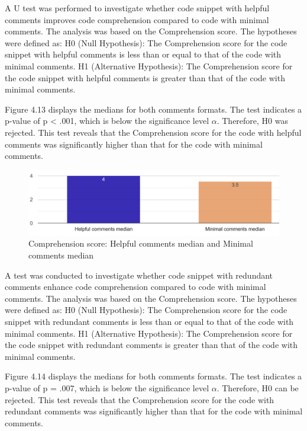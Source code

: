 A U test was performed to investigate whether code snippet with helpful comments improves code comprehension compared to code with minimal comments. The analysis was based on the Comprehension score. The hypotheses were defined as: H0 (Null Hypothesis): The Comprehension score for the code snippet with helpful comments is less than or equal to that of the code with minimal comments.  H1 (Alternative Hypothesis): The Comprehension score for the code snippet with helpful comments is greater than that of the code with minimal comments.

Figure 4.13 displays the medians for both comments formats.
The test indicates a p-value of p < .001, which is below the significance level $\alpha$. Therefore, H0 was rejected.  This test reveals that the Comprehension score for the code with helpful comments was significantly higher than that for the code with minimal comments. 

\begin{figure} [H]
  \centering
  \includegraphics[scale=0.43]{figures/h-m-q3.png}
  \caption{Comprehension score:  Helpful comments median and Minimal comments median}
  \label{fig:AnhangsChor}
\end{figure}


A test was conducted to investigate whether code snippet with redundant comments enhance code comprehension compared to code with minimal comments. The analysis was based on the Comprehension score. The hypotheses were defined as: H0 (Null Hypothesis): The Comprehension score for the code snippet with redundant comments is less than or equal to that of the code with minimal comments.  H1 (Alternative Hypothesis): The Comprehension score for the code snippet with redundant comments is greater than that of the code with minimal comments. 


Figure 4.14 displays the medians for both comments formats.
The test indicates a p-value of p = .007, which is below the significance level $\alpha $. Therefore, H0 can be rejected.  This test reveals that the Comprehension score for the code with redundant comments was significantly higher than that for the code with minimal comments. 

